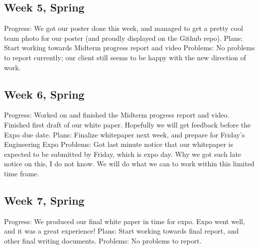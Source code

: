 \subsection{Week 5, Spring}
Progress: We got our poster done this week, and managed to get a pretty cool team photo for our poster (and proudly displayed on the Github repo).
Plans: Start working towards Midterm progress report and video
Problems: No problems to report currently; our client still seems to be happy with the new direction of work.
\subsection{Week 6, Spring}
Progress: Worked on and finished the Midterm progress report and video. Finished first draft of our white paper. Hopefully we will get feedback before the Expo due date.
Plans: Finalize whitepaper next week, and prepare for Friday's Engineering Expo
Problems: Got last minute notice that our whitepaper is expected to be submitted by Friday, which is expo day. Why we got such late notice on this, I do not know. We will do what we can to work within this limited time frame.
\subsection{Week 7, Spring}
Progress: We produced our final white paper in time for expo. Expo went well, and it was a great experience!
Plans: Start working towards final report, and other final writing documents.
Problems: No problems to report.
